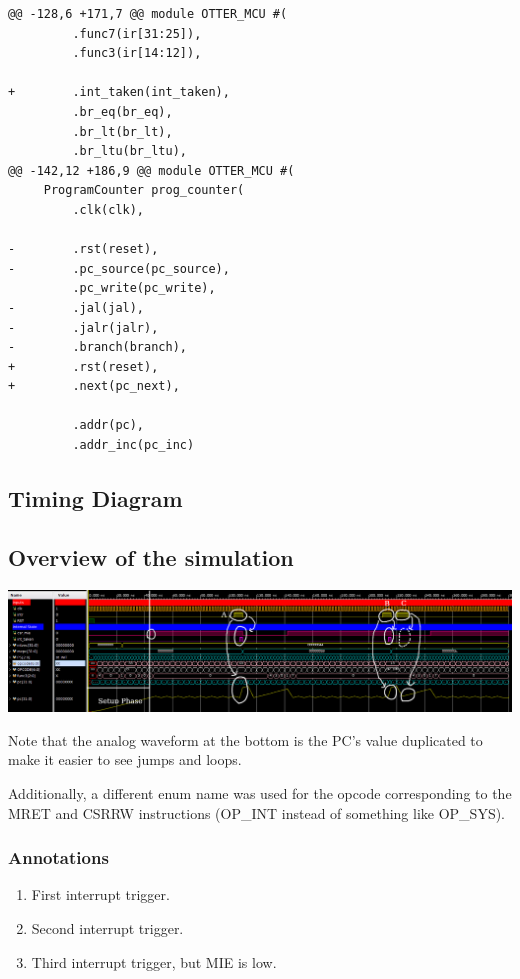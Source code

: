 \documentclass{article}
\begin{document}
\begin{verbatim}
@@ -128,6 +171,7 @@ module OTTER_MCU #(
         .func7(ir[31:25]),
         .func3(ir[14:12]),
         
+        .int_taken(int_taken),
         .br_eq(br_eq),
         .br_lt(br_lt),
         .br_ltu(br_ltu),
@@ -142,12 +186,9 @@ module OTTER_MCU #(
     ProgramCounter prog_counter(
         .clk(clk),
 
-        .rst(reset),
-        .pc_source(pc_source),
         .pc_write(pc_write),
-        .jal(jal),
-        .jalr(jalr),
-        .branch(branch),
+        .rst(reset),
+        .next(pc_next),
         
         .addr(pc),
         .addr_inc(pc_inc)
\end{verbatim}

\begin{landscape}
    \section{Timing Diagram}

    \subsection*{Overview of the simulation}
    \includegraphics[width=\linewidth]{wf2a.png}

    Note that the analog waveform at the bottom is the PC's value duplicated to make it easier to see jumps and loops.

    Additionally, a different enum name was used for the opcode corresponding to the MRET and CSRRW instructions (OP\_INT instead of something like OP\_SYS). 

    \subsubsection*{Annotations}
    \begin{enumerate}[label=\Alph*.]
        \item First interrupt trigger.
        \item Second interrupt trigger.
        \item Third interrupt trigger, but MIE is low.
    \end{enumerate}


\end{landscape}
\end{document}
